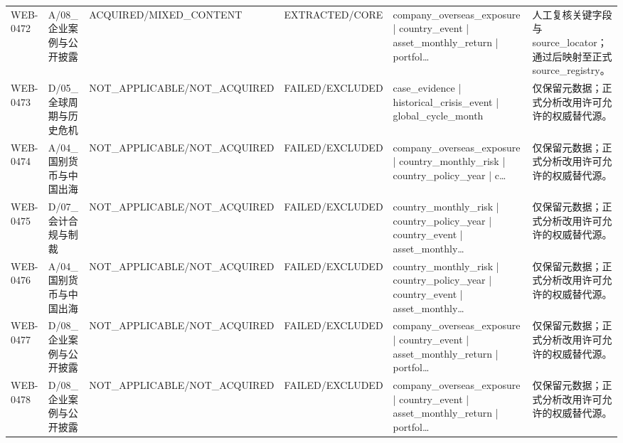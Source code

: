 \begin{landscape}
\begin{longtable}{p{1.8cm}p{2.6cm}p{2.6cm}p{2.6cm}p{4.8cm}p{7.2cm}}
WEB-0472 & A/\allowbreak{}08\_\allowbreak{}企业案例与公开披露 & ACQUIRED/\allowbreak{}MIXED\_\allowbreak{}CONTENT & EXTRACTED/\allowbreak{}CORE & company\_\allowbreak{}overseas\_\allowbreak{}exposure | country\_\allowbreak{}event | asset\_\allowbreak{}monthly\_\allowbreak{}return | portfol… & 人工复核关键字段与source\_\allowbreak{}locator；通过后映射至正式source\_\allowbreak{}registry。\\
WEB-0473 & D/\allowbreak{}05\_\allowbreak{}全球周期与历史危机 & NOT\_\allowbreak{}APPLICABLE/\allowbreak{}NOT\_\allowbreak{}ACQUIRED & FAILED/\allowbreak{}EXCLUDED & case\_\allowbreak{}evidence | historical\_\allowbreak{}crisis\_\allowbreak{}event | global\_\allowbreak{}cycle\_\allowbreak{}month & 仅保留元数据；正式分析改用许可允许的权威替代源。\\
WEB-0474 & A/\allowbreak{}04\_\allowbreak{}国别货币与中国出海 & NOT\_\allowbreak{}APPLICABLE/\allowbreak{}NOT\_\allowbreak{}ACQUIRED & FAILED/\allowbreak{}EXCLUDED & company\_\allowbreak{}overseas\_\allowbreak{}exposure | country\_\allowbreak{}monthly\_\allowbreak{}risk | country\_\allowbreak{}policy\_\allowbreak{}year | c… & 仅保留元数据；正式分析改用许可允许的权威替代源。\\
WEB-0475 & D/\allowbreak{}07\_\allowbreak{}会计合规与制裁 & NOT\_\allowbreak{}APPLICABLE/\allowbreak{}NOT\_\allowbreak{}ACQUIRED & FAILED/\allowbreak{}EXCLUDED & country\_\allowbreak{}monthly\_\allowbreak{}risk | country\_\allowbreak{}policy\_\allowbreak{}year | country\_\allowbreak{}event | asset\_\allowbreak{}monthly… & 仅保留元数据；正式分析改用许可允许的权威替代源。\\
WEB-0476 & A/\allowbreak{}04\_\allowbreak{}国别货币与中国出海 & NOT\_\allowbreak{}APPLICABLE/\allowbreak{}NOT\_\allowbreak{}ACQUIRED & FAILED/\allowbreak{}EXCLUDED & country\_\allowbreak{}monthly\_\allowbreak{}risk | country\_\allowbreak{}policy\_\allowbreak{}year | country\_\allowbreak{}event | asset\_\allowbreak{}monthly… & 仅保留元数据；正式分析改用许可允许的权威替代源。\\
WEB-0477 & D/\allowbreak{}08\_\allowbreak{}企业案例与公开披露 & NOT\_\allowbreak{}APPLICABLE/\allowbreak{}NOT\_\allowbreak{}ACQUIRED & FAILED/\allowbreak{}EXCLUDED & company\_\allowbreak{}overseas\_\allowbreak{}exposure | country\_\allowbreak{}event | asset\_\allowbreak{}monthly\_\allowbreak{}return | portfol… & 仅保留元数据；正式分析改用许可允许的权威替代源。\\
WEB-0478 & D/\allowbreak{}08\_\allowbreak{}企业案例与公开披露 & NOT\_\allowbreak{}APPLICABLE/\allowbreak{}NOT\_\allowbreak{}ACQUIRED & FAILED/\allowbreak{}EXCLUDED & company\_\allowbreak{}overseas\_\allowbreak{}exposure | country\_\allowbreak{}event | asset\_\allowbreak{}monthly\_\allowbreak{}return | portfol… & 仅保留元数据；正式分析改用许可允许的权威替代源。\\

\end{longtable}
\end{landscape}
